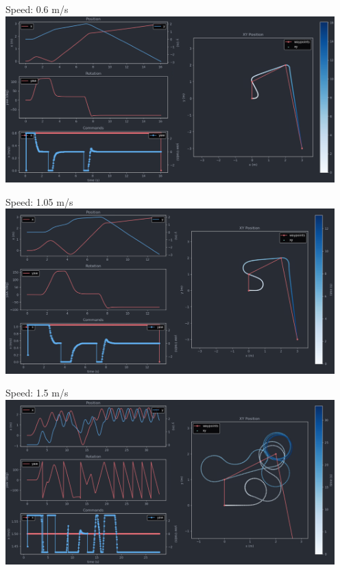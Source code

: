 \documentclass{article}
\begin{document}
        \begin{minipage}{\linewidth}
            \raggedright
            Speed: 0.6 m/s \break
            \includegraphics[width=5in]{Problem 6 Telemetry 0o6.png} \break
        \end{minipage}

        \begin{minipage}{\linewidth}
            \raggedright
            Speed: 1.05 m/s \break
            \includegraphics[width=5in]{Problem 6 Telemetry 1o05.png} \break        
        \end{minipage}

        \begin{minipage}{\linewidth}
            \raggedright
            Speed: 1.5 m/s \break
            \includegraphics[width=5in]{Problem 6 Telemetry 1o5.png} \break
        \end{minipage}
\end{document}
